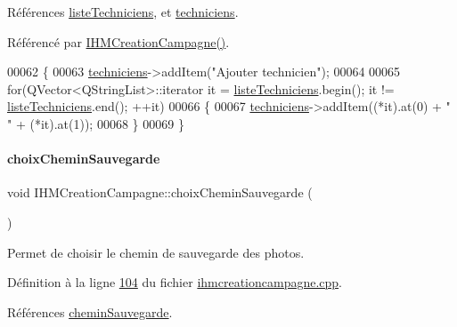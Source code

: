 Références \hyperlink{ihmcreationcampagne_8h_source_l00036}{liste\+Techniciens}, et \hyperlink{ihmcreationcampagne_8h_source_l00035}{techniciens}.



Référencé par \hyperlink{ihmcreationcampagne_8cpp_source_l00011}{I\+H\+M\+Creation\+Campagne()}.


\begin{DoxyCode}
00062 \{
00063     \hyperlink{class_i_h_m_creation_campagne_a8235e7a18cda1298be624a59a4cc1a56}{techniciens}->addItem(\textcolor{stringliteral}{"Ajouter technicien"});
00064 
00065     \textcolor{keywordflow}{for}(QVector<QStringList>::iterator it = \hyperlink{class_i_h_m_creation_campagne_aee78d20f0263359283cbcbc50fac3143}{listeTechniciens}.begin(); it != 
      \hyperlink{class_i_h_m_creation_campagne_aee78d20f0263359283cbcbc50fac3143}{listeTechniciens}.end(); ++it)
00066     \{
00067         \hyperlink{class_i_h_m_creation_campagne_a8235e7a18cda1298be624a59a4cc1a56}{techniciens}->addItem((*it).at(0) + \textcolor{stringliteral}{" "} + (*it).at(1));
00068     \}
00069 \}
\end{DoxyCode}
\mbox{\label{class_i_h_m_creation_campagne_aceedbe44750998444120ae6343bbdcc6}} 
\paragraph{\texorpdfstring{choix\+Chemin\+Sauvegarde}{choixCheminSauvegarde}}
{\footnotesize\ttfamily void I\+H\+M\+Creation\+Campagne\+::choix\+Chemin\+Sauvegarde (\begin{DoxyParamCaption}{ }\end{DoxyParamCaption})\hspace{0.3cm}{\ttfamily [slot]}}



Permet de choisir le chemin de sauvegarde des photos. 



Définition à la ligne \hyperlink{ihmcreationcampagne_8cpp_source_l00104}{104} du fichier \hyperlink{ihmcreationcampagne_8cpp_source}{ihmcreationcampagne.\+cpp}.



Références \hyperlink{ihmcreationcampagne_8h_source_l00031}{chemin\+Sauvegarde}.



